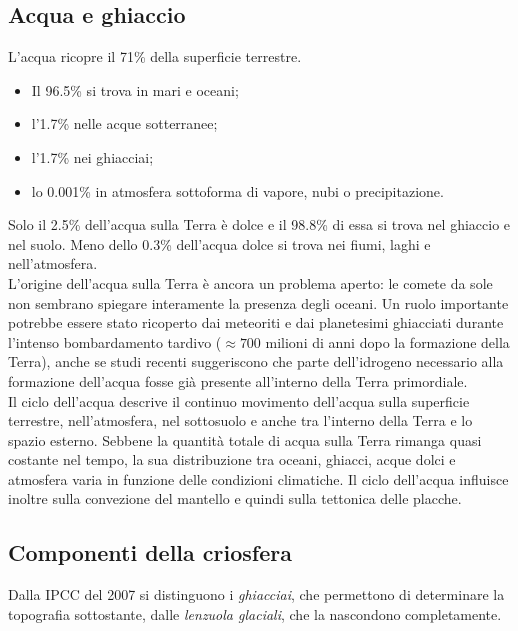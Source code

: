 \documentclass[a4paper,12pt]{book}
\begin{document}
\subsection{\textcolor{colore2}{Acqua e ghiaccio}}

L'acqua ricopre il 71\% della superficie terrestre.

\begin{itemize}
    \item Il 96.5\% si trova in mari e oceani;
    \item l'1.7\% nelle acque sotterranee;
    \item l'1.7\% nei ghiacciai;
    \item lo 0.001\% in atmosfera sottoforma di vapore, nubi o precipitazione.
\end{itemize}

Solo il 2.5\% dell'acqua sulla Terra è dolce e il 98.8\% di essa si trova nel ghiaccio e nel suolo.
Meno dello 0.3\% dell'acqua dolce si trova nei fiumi, laghi e nell'atmosfera.\\

\noindent
L’origine dell’acqua sulla Terra è ancora un problema aperto: le comete da sole non sembrano spiegare interamente la presenza degli oceani.
Un ruolo importante potrebbe essere stato ricoperto dai meteoriti e dai planetesimi ghiacciati durante l’intenso bombardamento tardivo ($\approx 700$ milioni di anni dopo la formazione della Terra), anche se studi recenti suggeriscono che parte dell’idrogeno necessario alla formazione dell’acqua fosse già presente all’interno della Terra primordiale.\\

Il ciclo dell'acqua descrive il continuo movimento dell’acqua sulla superficie terrestre, nell’atmosfera, nel sottosuolo e anche tra l’interno della Terra e lo spazio esterno.
Sebbene la quantità totale di acqua sulla Terra rimanga quasi costante nel tempo, la sua distribuzione tra oceani, ghiacci, acque dolci e atmosfera varia in funzione delle condizioni climatiche.
Il ciclo dell’acqua influisce inoltre sulla convezione del mantello e quindi sulla tettonica delle placche.

\subsection{\textcolor{colore2}{Componenti della criosfera}}

Dalla IPCC del 2007 si distinguono i \textit{ghiacciai}, che permettono di determinare la topografia sottostante, dalle \textit{lenzuola glaciali}, che la nascondono completamente.
\end{document}

